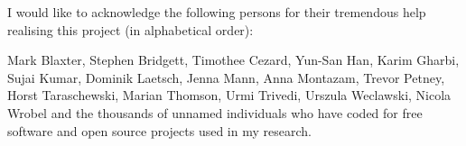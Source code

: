 

\begin{acknowledgements}      %


  I would like to acknowledge the following persons for their
  tremendous help realising this project (in alphabetical order):

  Mark Blaxter, Stephen Bridgett, Timothee Cezard, Yun-San Han, Karim
  Gharbi, Sujai Kumar, Dominik Laetsch, Jenna Mann, Anna Montazam,
  Trevor Petney, Horst Taraschewski, Marian Thomson, Urmi Trivedi,
  Urszula Weclawski, Nicola Wrobel and the thousands of unnamed
  individuals who have coded for free software and open source
  projects used in my research.

\end{acknowledgements}



